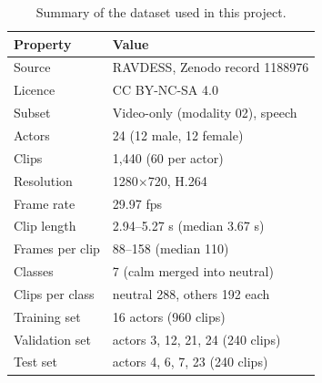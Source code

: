 \begin{table}[t]
\centering
\caption{Summary of the dataset used in this project.}
\label{tab:dataset}
\small
\begin{tabular}{@{}ll@{}}
\toprule
Property & Value \\
\midrule
Source & RAVDESS, Zenodo record 1188976 \\
Licence & CC BY-NC-SA 4.0 \\
Subset & Video-only (modality 02), speech \\
Actors & 24 (12 male, 12 female) \\
Clips & 1,440 (60 per actor) \\
Resolution & 1280$\times$720, H.264 \\
Frame rate & 29.97 fps \\
Clip length & 2.94--5.27 s (median 3.67 s) \\
Frames per clip & 88--158 (median 110) \\
Classes & 7 (calm merged into neutral) \\
Clips per class & neutral 288, others 192 each \\
Training set & 16 actors (960 clips) \\
Validation set & actors 3, 12, 21, 24 (240 clips) \\
Test set & actors 4, 6, 7, 23 (240 clips) \\
\bottomrule
\end{tabular}
\end{table}
